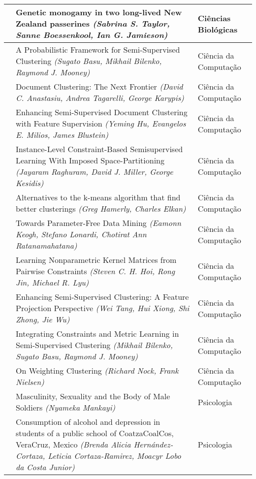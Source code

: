 \begin{flushleft}
\begin{longtable}{|C{0.6cm}|m{10.1cm}|C{4cm}|}
		\hline
		\rownumber & Genetic monogamy in two long-lived New Zealand passerines \textit{(Sabrina S. Taylor, Sanne Boessenkool, Ian G. Jamieson)} & Ciências Biológicas \\
	    \hline
	    \rownumber & A Probabilistic Framework for Semi-Supervised Clustering \textit{(Sugato Basu, Mikhail Bilenko, Raymond J. Mooney)} & Ciência da Computação\\
	    \hline
	    \rownumber & Document Clustering: The Next Frontier \textit{(David C. Anastasiu, Andrea Tagarelli, George Karypis)} & Ciência da Computação\\
	    \hline
	    \rownumber & Enhancing Semi-Supervised Document Clustering with Feature Supervision \textit{(Yeming Hu, Evangelos E. Milios, James Blustein)} & Ciência da Computação\\
	    \hline
	    \rownumber & Instance-Level Constraint-Based Semisupervised Learning With Imposed Space-Partitioning \textit{(Jayaram Raghuram, David J. Miller, George Kesidis)} & Ciência da Computação\\
		\hline
		\rownumber & Alternatives to the k-means algorithm that find better clusterings \textit{(Greg Hamerly, Charles Elkan)} & Ciência da Computação\\
		\hline
		\rownumber & Towards Parameter-Free Data Mining \textit{(Eamonn Keogh, Stefano Lonardi, Chotirat Ann Ratanamahatana)} & Ciência da Computação\\
		\hline
		\rownumber & Learning Nonparametric Kernel Matrices from Pairwise Constraints \textit{(Steven C. H. Hoi, Rong Jin, Michael R. Lyu)} & Ciência da Computação\\
		\hline
		\rownumber & Enhancing Semi-Supervised Clustering: A Feature Projection Perspective \textit{(Wei Tang, Hui Xiong, Shi Zhong, Jie Wu)} & Ciência da Computação\\
		\hline
		\rownumber & Integrating Constraints and Metric Learning in Semi-Supervised Clustering \textit{(Mikhail Bilenko, Sugato Basu, Raymond J. Mooney)} & Ciência da Computação\\
		\hline
		\rownumber & On Weighting Clustering \textit{(Richard Nock, Frank Nielsen)} & Ciência da Computação\\
	    \hline
	    \rownumber & Masculinity, Sexuality and the Body of Male Soldiers \textit{(Nyameka Mankayi)} & Psicologia \\
	    \hline
	    \rownumber & Consumption of alcohol and depression in students of a public school of CoatzaCoalCos, VeraCruz, Mexico \textit{(Brenda Alicia Hernández-Cortaza, Leticia Cortaza-Ramirez, Moacyr Lobo da Costa Junior)} & Psicologia \\

\end{longtable}
\end{flushleft}
